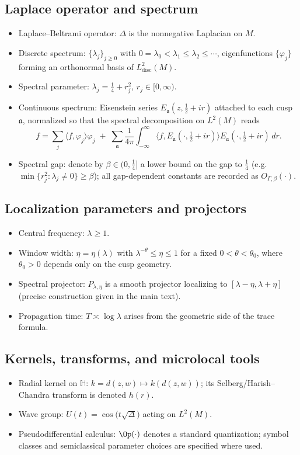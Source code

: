 \subsection*{Laplace operator and spectrum}
\begin{itemize}
  \item Laplace--Beltrami operator: $\Delta$ is the nonnegative Laplacian on $M$.
  \item Discrete spectrum: $\{\lambda_j\}_{j\ge 0}$ with $0=\lambda_0<\lambda_1\le \lambda_2\le\cdots$, eigenfunctions $\{\varphi_j\}$ forming an orthonormal basis of $L^2_{\mathrm{disc}}(M)$.
  \item Spectral parameter: $\lambda_j=\tfrac{1}{4}+r_j^2$, $r_j\in[0,\infty)$.
  \item Continuous spectrum: Eisenstein series $E_{\mathfrak{a}}(z,\tfrac{1}{2}+ir)$ attached to each cusp $\mathfrak{a}$, normalized so that the spectral decomposition on $L^2(M)$ reads
  \[
    f=\sum_j \langle f,\varphi_j\rangle \varphi_j \;+\; \sum_{\mathfrak{a}}\frac{1}{4\pi}\int_{-\infty}^{\infty} \langle f,E_{\mathfrak{a}}(\cdot,\tfrac{1}{2}+ir)\rangle E_{\mathfrak{a}}(\cdot,\tfrac{1}{2}+ir)\,dr.
  \]
  \item Spectral gap: denote by $\beta\in(0,\tfrac{1}{4}]$ a lower bound on the gap to $\tfrac{1}{4}$ (e.g. $\min\{r_j^2:\lambda_j\ne 0\}\ge \beta$); all gap-dependent constants are recorded as $O_{\Gamma,\beta}(\cdot)$.
\end{itemize}

\subsection*{Localization parameters and projectors}
\begin{itemize}
  \item Central frequency: $\lambda\ge 1$.
  \item Window width: $\eta=\eta(\lambda)$ with $\lambda^{-\theta}\le \eta\le 1$ for a fixed $0<\theta<\theta_0$, where $\theta_0>0$ depends only on the cusp geometry.
  \item Spectral projector: $P_{\lambda,\eta}$ is a smooth projector localizing to $[\lambda-\eta,\lambda+\eta]$ (precise construction given in the main text).
  \item Propagation time: $T\asymp \log \lambda$ arises from the geometric side of the trace formula.
\end{itemize}

\subsection*{Kernels, transforms, and microlocal tools}
\begin{itemize}
  \item Radial kernel on $\mathbb{H}$: $k=d(z,w)\mapsto k(d(z,w))$; its Selberg/Harish–Chandra transform is denoted $h(r)$.
  \item Wave group: $U(t)=\cos\!\big(t\sqrt{\Delta}\big)$ acting on $L^2(M)$.
  \item Pseudodifferential calculus: $\Op(\cdot)$ denotes a standard quantization; symbol classes and semiclassical parameter choices are specified where used.
\end{itemize}

